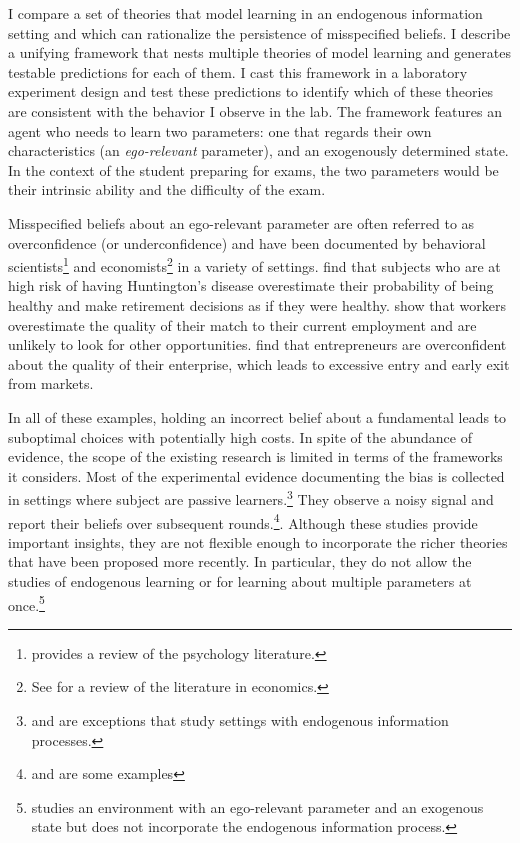 \documentclass[
  12pt,
]{article}
\begin{document}
I compare a set of theories that model learning in an endogenous
information setting and which can rationalize the persistence of
misspecified beliefs. I describe a unifying framework that nests
multiple theories of model learning and generates testable predictions
for each of them. I cast this framework in a laboratory experiment
design and test these predictions to identify which of these theories
are consistent with the behavior I observe in the lab. The framework
features an agent who needs to learn two parameters: one that regards
their own characteristics (an \emph{ego-relevant} parameter), and an
exogenously determined state. In the context of the student preparing
for exams, the two parameters would be their intrinsic ability and the
difficulty of the exam.

Misspecified beliefs about an ego-relevant parameter are often referred
to as overconfidence (or underconfidence) and have been documented by
behavioral scientists\footnote{\citet{kelley1980} 
provides a review of the psychology literature.} and
economists\footnote{See \citet{benjamin2019} 
for a review of the literature in economics.} in a variety of settings.
\citet{Oster2013} find that subjects who are at high risk of having
Huntington's disease overestimate their probability of being healthy and
make retirement decisions as if they were healthy. \citet{Hoffman2020}
show that workers overestimate the quality of their match to their
current employment and are unlikely to look for other opportunities.
\citet{Camerer1999} find that entrepreneurs are overconfident about the
quality of their enterprise, which leads to excessive entry and early
exit from markets.

In all of these examples, holding an incorrect belief about a
fundamental leads to suboptimal choices with potentially high costs. In
spite of the abundance of evidence, the scope of the existing research
is limited in terms of the frameworks it considers. Most of the
experimental evidence documenting the bias is collected in settings
where subject are passive learners.\footnote{
\citet{Gotte2022} and \citet{Ozyilmaz2022} are exceptions that study settings with endogenous information processes.}
They observe a noisy signal and report their beliefs over subsequent
rounds.\footnote{\citet{Bracha2012} and 
\citet{Mobius2022} are some examples}. Although these studies provide
important insights, they are not flexible enough to incorporate the
richer theories that have been proposed more recently. In particular,
they do not allow the studies of endogenous learning or for learning
about multiple parameters at once.\footnote{\citet{Coutts2020} 
studies an environment with an ego-relevant parameter and an exogenous state but does not 
incorporate the endogenous information process.}
\end{document}
